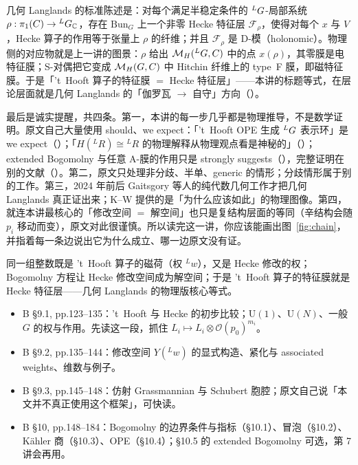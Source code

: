 几何 Langlands 的标准陈述是：对每个满足半稳定条件的 ${}^{L}G$-局部系统 $\rho:\pi_1(C)\to{}^{L}G_{\mathbb{C}}$，存在 $\mathrm{Bun}_G$ 上一个非零 Hecke 特征层 $\mathcal F_\rho$，使得对每个 $x$ 与 $V$，Hecke 算子的作用等于张量上 $\rho$ 的纤维；并且 $\mathcal F_\rho$ 是 D-模（holonomic）。物理侧的对应物就是上一讲的图景：$\rho$ 给出 $\mathcal{M}_{H}({}^{L}G,C)$ 中的点 $x(\rho)$，其零膜是电特征膜；S-对偶把它变成 $\mathcal{M}_{H}(G,C)$ 中 Hitchin 纤维上的 type~F 膜，即磁特征膜。于是「't~Hooft 算子的特征膜 $=$ Hecke 特征层」——本讲的标题等式，在层论层面就是几何 Langlands 的「伽罗瓦 $\to$ 自守」方向（）。

最后是诚实提醒，共四条。第一，本讲的每一步几乎都是物理推导，不是数学证明。原文自己大量使用 should、we expect：「't~Hooft OPE 生成 ${}^{L}G$ 表示环」是 we expect（）；「$H({}^{L}R)\cong{}^{L}R$ 的物理解释从物理观点看是神秘的」（）；extended Bogomolny 与任意 A-膜的作用只是 strongly suggests（），完整证明在别的文献（）。第二，原文只处理非分歧、半单、generic 的情形；分歧情形属于别的工作。第三，2024 年前后 Gaitsgory 等人的纯代数几何工作才把几何 Langlands 真正证出来；K--W 提供的是「为什么应该如此」的物理图像。第四，就连本讲最核心的「修改空间 $=$ 解空间」也只是复结构层面的等同（辛结构会随 $p_i$ 移动而变），原文对此很谨慎。所以读完这一讲，你应该能画出图~\ref{fig:chain}，并指着每一条边说出它为什么成立、哪一边原文没有证。

\begin{keybox}
同一组整数既是 't~Hooft 算子的磁荷（权 ${}^{L}w$），又是 Hecke 修改的权；Bogomolny 方程让 Hecke 修改空间成为解空间；于是 't~Hooft 算子的特征膜就是 Hecke 特征层——几何 Langlands 的物理版核心等式。
\end{keybox}

\begin{follow}
\begin{itemize}
\item B \S9.1, pp.123--135：'t~Hooft 与 Hecke 的初步比较；$\mathrm{U}(1)$、$\mathrm{U}(N)$、一般 $G$ 的权与作用。先读这一段，抓住 $L_i\mapsto L_i\otimes\mathcal O(p_0)^{m_i}$。
\item B \S9.2, pp.135--144：修改空间 $Y({}^{L}w)$ 的显式构造、紧化与 associated weights、维数与例子。
\item B \S9.3, pp.145--148：仿射 Grassmannian 与 Schubert 胞腔；原文自己说「本文并不真正使用这个框架」，可快读。
\item B \S10, pp.148--184：Bogomolny 的边界条件与指标（\S10.1）、冒泡（\S10.2）、K\"ahler 商（\S10.3）、OPE（\S10.4）；\S10.5 的 extended Bogomolny 可选，第 7 讲会再用。
\end{itemize}
\end{follow}

